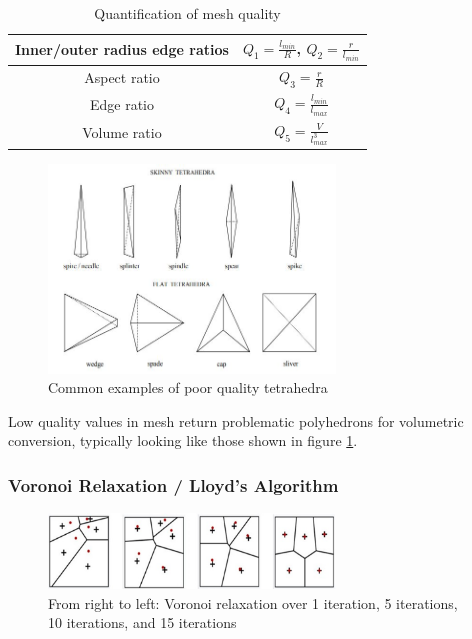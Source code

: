 \documentclass[12pt]{drexelthesis}
\let\Oldsubsubsection\subsubsection
\renewcommand{\subsubsection}{\FloatBarrier\Oldsubsubsection}
\begin{document}
\begin{table}
	\centering
		\caption{Quantification of mesh quality}
		\begin{tabular}{| c | c |}
			\hline
			Inner/outer radius edge ratios & $Q_{1} = \frac{l_{min}}{R}$, $Q_{2} = \frac{r}{l_{min}}$
			\\ \hline
			Aspect ratio & $Q_{3} = \frac{r}{R}$
			\\ \hline
			Edge ratio & $Q_{4} = \frac{l_{min}}{l_{max}}$
			\\ \hline
			Volume ratio & $Q_{5} = \frac{V}{l_{max}^{3}}$
			\\ \hline
		\end{tabular}
\end{table}

\begin{figure}[!h]
	\centering
		\includegraphics[width=3in]{bad_tetrahedra.JPG}
		\caption[Examples of poor quality tetrahedra]
		{\centering Common examples of poor quality tetrahedra}
		\label{fig:badtetrahedra}
\end{figure}

Low  quality  values  in  mesh  return  problematic  polyhedrons  for  volumetric  conversion,  typically  looking  like  those  shown  in  figure \ref{fig:badtetrahedra}.



\subsubsection{Voronoi Relaxation / Lloyd's Algorithm}

\begin{figure}[!h]
	\centering
		\includegraphics[width=3in]{voronoirelaxation.PNG}
		\caption[Demonstration of voronoi relaxation over several iterations]
		{\centering From right to left: Voronoi relaxation over 1 iteration, 5 iterations, 10 iterations, and 15 iterations}
		\label{fig:voronoirelaxation}
\end{figure}
\end{document}
